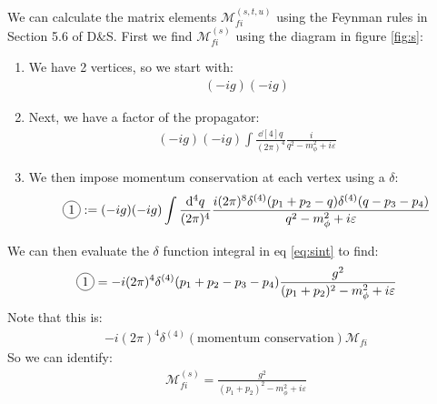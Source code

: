 \documentclass[12pt]{article}
\newcommand{\veps}{\varepsilon}
\newcommand{\circled}[1]{\tikz[baseline=(char.base)]{
    \node[shape=circle,draw,inner sep=2pt](char){#1};}}
\begin{document}
We can calculate the matrix elements $\mathcal{M}_{fi}^{(s,t,u)}$ using the Feynman rules in Section 5.6 of D\&S. First we find $\mathcal{M}_{fi}^{(s)}$ using the diagram in figure \ref{fig:s}:
\begin{enumerate}
\item We have 2 vertices, so we start with:
  \begin{align*}
    (-ig)(-ig)
  \end{align*}
\item Next, we have a factor of the propagator:
  \begin{align*}
    (-ig)(-ig)\int\frac{\dd[4]{q}}{(2\pi)^4}\frac{i}{q^2-m_\phi^2+i\veps}
  \end{align*}
\item We then impose momentum conservation at each vertex using a $\delta$:
  \begin{align}
    \label{eq:sint}
    \circled{1}:=
    (-ig)(-ig)\int\frac{\dd[4]{q}}{(2\pi)^4}
    \frac{i(2\pi)^8\delta^{(4)}(p_1+p_2-q)\delta^{(4)}(q-p_3-p_4)}
    {q^2-m_\phi^2+i\veps}
  \end{align}
\end{enumerate}

We can then evaluate the $\delta$ function integral in eq \eqref{eq:sint} to find:
\begin{align*}
  \circled{1}=
  -i(2\pi)^4\delta^{(4)}(p_1+p_2-p_3-p_4)\frac{g^2}{(p_1+p_2)^2-m_\phi^2+i\veps}
\end{align*}
Note that this is:
\begin{align*}
  -i(2\pi)^4\delta^{(4)}(\text{momentum conservation})\mathcal{M}_{fi}
\end{align*}
So we can identify:
\begin{align*}
  \mathcal{M}^{(s)}_{fi}=\frac{g^2}{(p_1+p_2)^2-m^2_\phi+i\veps}
\end{align*}
\end{document}
